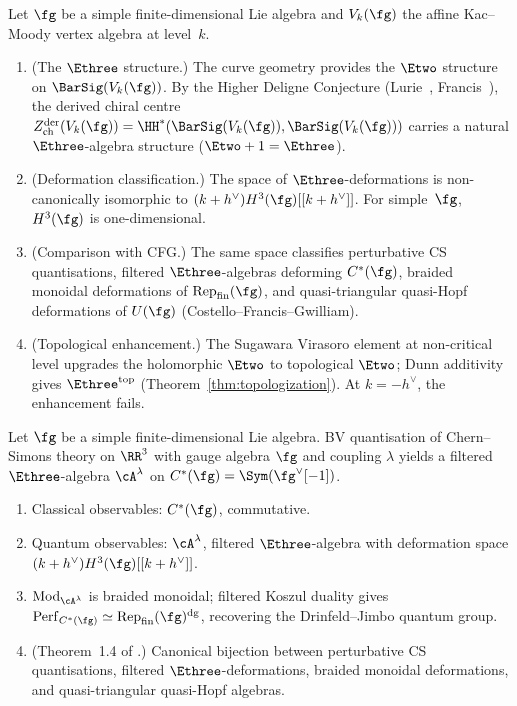 
\begin{theorem}
\label{thm:e3-cs}
\ClaimStatusProvedElsewhere
Let $\fg$ be a simple finite-dimensional Lie algebra and
$V_k(\fg)$ the affine Kac--Moody vertex algebra at level~$k$.
\begin{enumerate}[label=\textup{(\roman*)}]
\item \textup{(The $\Ethree$ structure.)}
  The curve geometry provides the $\Etwo$ structure on
  $\BarSig(V_k(\fg))$. By the Higher Deligne Conjecture
  \textup{(}Lurie~\cite{HA}, Francis~\cite{Francis2013}\textup{)},
  the derived chiral centre
  $Z^{\mathrm{der}}_{\mathrm{ch}}(V_k(\fg))
  = \HH^*(\BarSig(V_k(\fg)), \BarSig(V_k(\fg)))$
  carries a natural $\Ethree$-algebra structure
  \textup{(}$\Etwo + 1 = \Ethree$\textup{)}.
\item \textup{(Deformation classification.)}
  The space of $\Ethree$-deformations is
  non-canonically isomorphic to
  $(k+h^\vee) H^3(\fg)[[k+h^\vee]]$. For simple~$\fg$,
  $H^3(\fg)$ is one-dimensional.
\item \textup{(Comparison with CFG.)}
  The same space classifies perturbative CS quantisations,
  filtered $\Ethree$-algebras deforming $C^*(\fg)$,
  braided monoidal deformations of
  $\mathrm{Rep}_{\mathrm{fin}}(\fg)$, and
  quasi-triangular quasi-Hopf deformations of $U(\fg)$
  \textup{(}Costello--Francis--Gwilliam\textup{)}.
\item \textup{(Topological enhancement.)}
  The Sugawara Virasoro element at non-critical level
  upgrades the holomorphic $\Etwo$ to topological $\Etwo$;
  Dunn additivity gives $\Ethree^{\mathrm{top}}$
  \textup{(}Theorem~\textup{\ref{thm:topologization}}\textup{)}.
  At $k = -h^\vee$, the enhancement fails.
\end{enumerate}
\end{theorem}

\begin{theorem}
\label{thm:cfg}
\ClaimStatusProvedElsewhere
Let $\fg$ be a simple finite-dimensional Lie algebra.
BV quantisation of Chern--Simons theory on $\RR^3$ with
gauge algebra $\fg$ and coupling $\lambda$ yields
a filtered $\Ethree$-algebra $\cA^\lambda$ on
$C^*(\fg) = \Sym(\fg^\vee[-1])$.
\begin{enumerate}[label=\textup{(\roman*)}]
\item Classical observables: $C^*(\fg)$, commutative.
\item Quantum observables: $\cA^\lambda$, filtered
  $\Ethree$-algebra with deformation space
  $(k+h^\vee) H^3(\fg)[[k+h^\vee]]$.
\item $\mathrm{Mod}_{\cA^\lambda}$ is braided monoidal;
  filtered Koszul duality gives
  $\mathrm{Perf}_{C^*(\fg)} \simeq
  \mathrm{Rep}_{\mathrm{fin}}(\fg)^{\mathrm{dg}}$,
  recovering the Drinfeld--Jimbo quantum group.
\item \textup{(Theorem~1.4 of \cite{CFG26}.)} Canonical
  bijection between perturbative CS quantisations,
  filtered $\Ethree$-deformations, braided monoidal
  deformations, and quasi-triangular quasi-Hopf algebras.
\end{enumerate}
\end{theorem}

